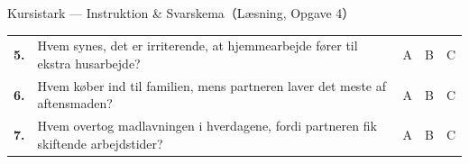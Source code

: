 \begin{emailbox}{Kursistark --- Instruktion \& Svarskema（Læsning, Opgave 4）}
{\begin{tabularx}{\linewidth}{@{} >{\bfseries}p{0.6cm} >{\raggedright\arraybackslash}X >{\centering\arraybackslash}p{1.65cm} >{\centering\arraybackslash}p{1.65cm} >{\centering\arraybackslash}p{1.65cm} @{}}
5. & Hvem synes, det er irriterende, at hjemmearbejde fører til ekstra husarbejde? & A \underline{\hspace{0.45cm}} & B \underline{\hspace{0.45cm}} & C \underline{\hspace{0.45cm}} \\
6. & Hvem køber ind til familien, mens partneren laver det meste af aftensmaden? & A \underline{\hspace{0.45cm}} & B \underline{\hspace{0.45cm}} & C \underline{\hspace{0.45cm}} \\
7. & Hvem overtog madlavningen i hverdagene, fordi partneren fik skiftende arbejdstider? & A \underline{\hspace{0.45cm}} & B \underline{\hspace{0.45cm}} & C \underline{\hspace{0.45cm}} \\
\bottomrule
\end{tabularx}
}
\end{emailbox}

